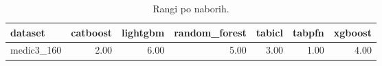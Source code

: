 \begin{table}[htbp]
\centering
\caption{Rangi po naborih.}
\label{tab:ranks}
\begin{tabular}{lrrrrrr}
\hline
dataset & catboost & lightgbm & random\_forest & tabicl & tabpfn & xgboost \\
\hline
medic3\_160 & 2.00 & 6.00 & 5.00 & 3.00 & 1.00 & 4.00 \\
\hline
\end{tabular}
\end{table}
